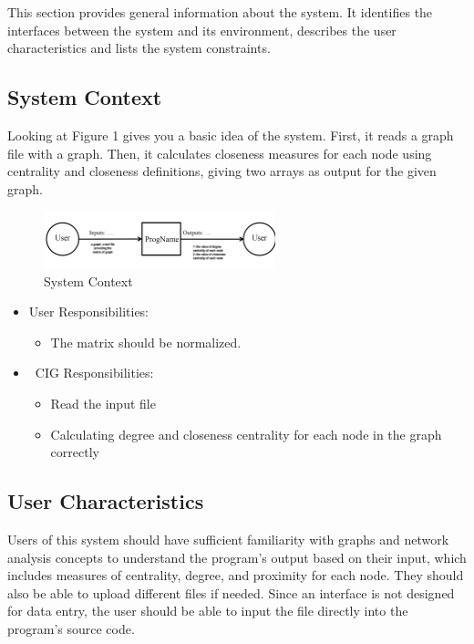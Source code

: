 \documentclass[12pt]{article}
\begin{document}
This section provides general information about the system.  It identifies the
interfaces between the system and its environment, describes the user
characteristics and lists the system constraints. 

\subsection{System Context}


Looking at Figure 1 gives you a basic idea of the system. First, it reads a graph file with a graph. Then, it calculates closeness measures for each node using centrality and closeness definitions, giving two arrays as output for the given graph.

\begin{figure}[h!]
\begin{center}
 \includegraphics[width=0.6\textwidth]{srspicture}
\caption{System Context}
\label{Fig_SystemContext} 
\end{center}
\end{figure}


\begin{itemize}
\item User Responsibilities: 
\begin{itemize}
\item The matrix should be normalized.
\end{itemize}
\item \ CIG Responsibilities:
\begin{itemize}
\item Read the input file
\item Calculating degree and closeness centrality for each node in the graph correctly
\end{itemize}
\end{itemize}




\subsection{User Characteristics} \label{SecUserCharacteristics}
Users of this system should have sufficient familiarity with graphs and network analysis concepts to understand the program's output based on their input, which includes measures of centrality, degree, and proximity for each node. They should also be able to upload different files if needed. Since an interface is not designed for data entry, the user should be able to input the file directly into the program's source code.
\end{document}
